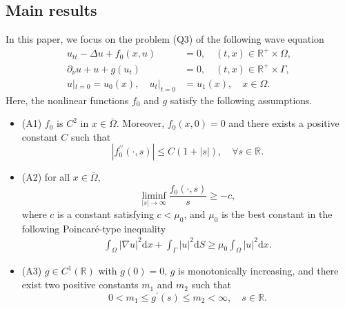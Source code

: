 \documentclass{elsarticle}
\begin{document}
\subsection{Main results}

In this paper, we focus on the problem (Q3) of the following wave equation
\begin{equation}\label{wave_eq2}
\begin{split}
	u_{tt} - \Delta u +f_0(x, u) &= 0, \quad (t, x)\in\mathbb{R}^{+} \times \Omega,\\
	\partial_{\nu}u + u + g(u_{t})&= 0,  \quad (t, x)\in \mathbb{R}^{+} \times \Gamma,\\
	u|_{t=0} = u_{0}(x), \quad u_{t}|_{t=0} &= u_{1}(x), \quad x\in \Omega. 
\end{split}
\end{equation}
Here, the nonlinear functions $f_0$ and $g$ satisfy the following assumptions.
\begin{itemize}
\item (A1) $f_0$ is $C^2$ in $x \in \bar{\Omega}$. Moreover, $f_0(x, 0) = 0$ and there exists a positive constant $C$ such that
\begin{equation} \label{assumption_critical}
	|f_0^{\prime\prime}(\cdot, s)| \leq C(1+|s|), \quad  \forall s \in \mathbb{R}.
\end{equation}
\item (A2) for all $x \in \bar{\Omega}$,
\begin{equation} \label{assumption_growth_1}
    \liminf_{|s| \rightarrow \infty}\frac{f_{0}(\cdot, s)}{s}\geq -c,
\end{equation}
where $c$ is a constant satisfying $c<\mu_{0}$, and $\mu_{0}$ is the best constant in the following Poincar\'e-type inequality
\begin{eqnarray*}
	\int_{\Omega}|\nabla u|^2\mathrm{d}x + \int_{\Gamma}|u|^2\mathrm{d}S \geq \mu_{0}\int_{\Omega}|u|^2\mathrm{d}x.
\end{eqnarray*}
\item (A3) $g\in C^{1}(\mathbb{R})$ with $g(0)=0$, $g$ is monotonically increasing, and there exist two positive constants $m_1$ and $m_2$ such that
\begin{equation} \label{assumption_g}
	0<m_{1} \leq g^{\prime}(s) \leq m_{2}< \infty, \quad s\in\mathbb{R}.
\end{equation}
\end{itemize}
\end{document}
